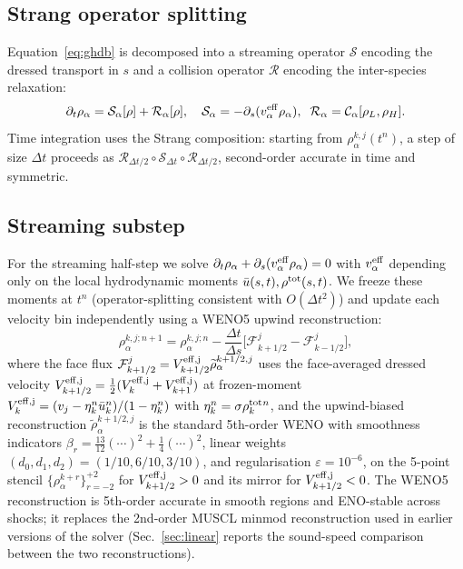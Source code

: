 \documentclass[aps,pre,twocolumn,superscriptaddress,longbibliography,floatfix]{revtex4-2}
\begin{document}
\subsection{Strang operator splitting}

Equation~\eqref{eq:ghdb} is decomposed into a streaming
operator $\mathcal{S}$ encoding the dressed transport in $s$ and
a collision operator $\mathcal{R}$ encoding the inter-species
relaxation:
\begin{equation}
\partial_t \rho_\alpha = \mathcal{S}_\alpha[\rho]
+ \mathcal{R}_\alpha[\rho],
\quad
\mathcal{S}_\alpha = -\partial_s(v^{\rm eff}_\alpha\rho_\alpha),
\;\;
\mathcal{R}_\alpha = \mathcal{C}_\alpha[\rho_L,\rho_H].
\label{eq:split}
\end{equation}
Time integration uses the Strang composition: starting from
$\rho_\alpha^{k,j}(t^n)$, a step of size $\Delta t$ proceeds as
$\mathcal{R}_{\Delta t/2} \circ \mathcal{S}_{\Delta t} \circ
\mathcal{R}_{\Delta t/2}$, second-order accurate in time and
symmetric.

\subsection{Streaming substep}

For the streaming half-step we solve
$\partial_t \rho_\alpha + \partial_s(v^{\rm eff}_\alpha
\rho_\alpha)=0$
with $v^{\rm eff}_\alpha$ depending only on the local hydrodynamic
moments $\bar u(s,t),\rho^{\rm tot}(s,t)$. We freeze these
moments at $t^n$ (operator-splitting consistent with
$O(\Delta t^2)$) and update each velocity bin independently
using a WENO5 upwind reconstruction:
\begin{equation}
\rho_\alpha^{k,j;n+1} = \rho_\alpha^{k,j;n}
-\frac{\Delta t}{\Delta s}\bigl[\mathcal{F}^{j}_{k+1/2}
                              -\mathcal{F}^{j}_{k-1/2}\bigr],
\label{eq:godunov}
\end{equation}
where the face flux
$\mathcal{F}^{j}_{k+1/2}=V^{\rm eff,j}_{k+1/2}
\widetilde\rho_\alpha^{k+1/2,j}$
uses the face-averaged dressed velocity
$V^{\rm eff,j}_{k+1/2}=
\tfrac12(V^{\rm eff,j}_k+V^{\rm eff,j}_{k+1})$ at frozen-moment
$V^{\rm eff,j}_k = (v_j - \eta_k^n\bar u_k^n)/(1-\eta_k^n)$
with $\eta_k^n=\sigma\rho^{\rm tot}_k{}^n$, and the
upwind-biased reconstruction
$\widetilde\rho_\alpha^{k+1/2,j}$ is the standard 5th-order
WENO with smoothness indicators
$\beta_r=\tfrac{13}{12}(\cdots)^2+\tfrac{1}{4}(\cdots)^2$,
linear weights $(d_0,d_1,d_2)=(1/10,6/10,3/10)$, and
regularisation $\varepsilon=10^{-6}$, on the 5-point stencil
$\{\rho^{k+r}_\alpha\}_{r=-2}^{+2}$ for
$V^{\rm eff,j}_{k+1/2}>0$ and its mirror for
$V^{\rm eff,j}_{k+1/2}<0$. The WENO5 reconstruction is
5th-order accurate in smooth regions and ENO-stable across
shocks; it replaces the 2nd-order MUSCL minmod
reconstruction used in earlier versions of the solver
(Sec.~\ref{sec:linear} reports the sound-speed comparison
between the two reconstructions).
\end{document}
